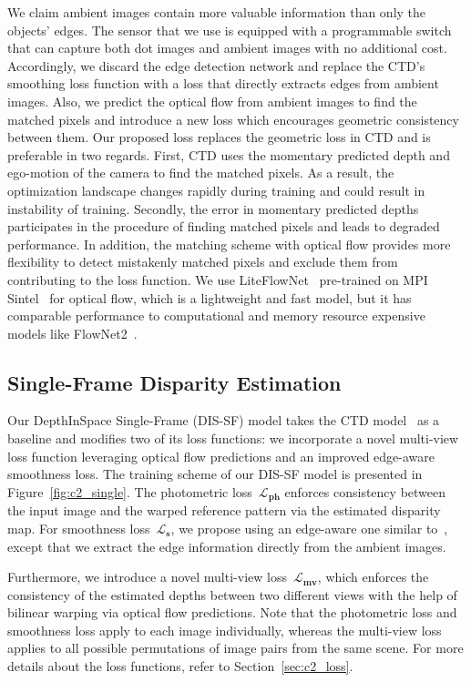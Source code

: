 We claim ambient images contain more valuable information than only the objects' edges. The sensor that we use is equipped with a programmable switch that can capture both dot images and ambient images with no additional cost. Accordingly, we discard the edge detection network and replace the CTD's smoothing loss function with a loss that directly extracts edges from ambient images. Also, we predict the optical flow from ambient images to find the matched pixels and introduce a new loss which encourages geometric consistency between them. Our proposed loss replaces the geometric loss in CTD and is preferable in two regards. First, CTD uses the momentary predicted depth and ego-motion of the camera to find the matched pixels. As a result, the optimization landscape changes rapidly during training and could result in instability of training. Secondly, the error in momentary predicted depths participates in the procedure of finding matched pixels and leads to degraded performance. In addition, the matching scheme with optical flow provides more flexibility to detect mistakenly matched pixels and exclude them from contributing to the loss function. We use LiteFlowNet~\citep{hui2018liteflownet} pre-trained on MPI Sintel~\citep{butler2012naturalistic} for optical flow, which is a lightweight and fast model, but it has comparable performance to computational and memory resource expensive models like FlowNet2~\citep{ilg2017flownet}.

\subsection{Single-Frame Disparity Estimation} \label{sec:c2_single-frame}

Our DepthInSpace Single-Frame (DIS-SF) model takes the CTD model~\citep{riegler2019connecting} as a baseline and modifies two of its loss functions: we incorporate a novel multi-view loss function leveraging optical flow predictions and an improved edge-aware smoothness loss. The training scheme of our DIS-SF model is presented in Figure~\ref{fig:c2_single}. The photometric loss~$\boldsymbol{\mathcal{L}_{ph}}$ enforces consistency between the input image and the warped reference pattern via the estimated disparity map. For smoothness loss~$\boldsymbol{\mathcal{L}_{s}}$, we propose using an edge-aware one similar to~\cite{godard2017unsupervised, godard2019digging, pillai2019superdepth}, except that we extract the edge information directly from the ambient images.

Furthermore, we introduce a novel multi-view loss~$\boldsymbol{\mathcal{L}_{mv}}$, which enforces the consistency of the estimated depths between two different views with the help of bilinear warping via optical flow predictions. Note that the photometric loss and smoothness loss apply to each image individually, whereas the multi-view loss applies to all possible permutations of image pairs from the same scene. For more details about the loss functions, refer to Section~\ref{sec:c2_loss}.


